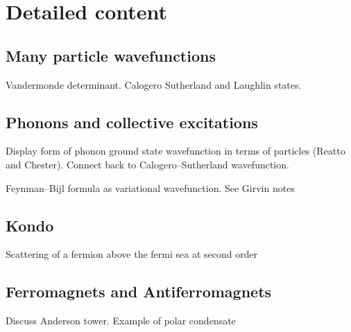 \section{Detailed content}

\subsection{Many particle wavefunctions}

Vandermonde determinant. Calogero Sutherland and Laughlin states.

\subsection{Phonons and collective excitations}

Display form of phonon ground state wavefunction in terms of particles (Reatto and Chester). Connect back to Calogero--Sutherland wavefunction. 

Feynman--Bijl formula as variational wavefunction. See Girvin notes

\subsection{Kondo}

Scattering of a fermion above the fermi sea at second order

\subsection{Ferromagnets and Antiferromagnets}

Discuss Anderson tower. Example of polar condensate